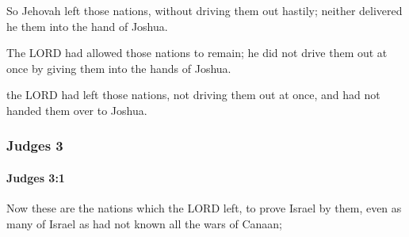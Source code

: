 			\begin{versebox}
					\item[BHS] 
					\item[ASV] So Jehovah left those nations, without driving them out hastily; neither delivered he them into the hand of Joshua.
					\item[NIV] The LORD had allowed those nations to remain; he did not drive them out at once by giving them into the hands of Joshua.
					\item[NRSV] the LORD had left those nations, not driving them out at once, and had not handed them over to Joshua.
			\end{versebox}
	\subsubsection{Judges 3} %
		\label{JUDGES-3}

		\paragraph{Judges 3:1} %
			\label{JUDGES-3-1}

			Now these are the nations which the LORD left, to prove Israel by them, even as many of Israel as had not known all the wars of Canaan;

